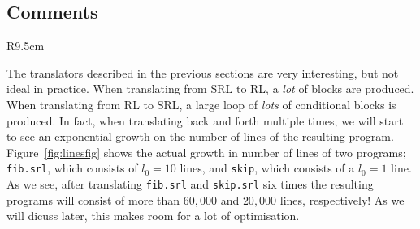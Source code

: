\pgfplotsset{compat = 1.3}
\subsection{Comments}
\begin{wrapfigure}{R}{9.5cm}
  \caption{Growth of a program for each translation.}\label{fig:linesfig}%
\end{wrapfigure}
The translators described in the previous sections are very interesting, but not ideal in practice. When translating from SRL to RL, a \textit{lot} of blocks are produced. When translating from RL to SRL, a large loop of \textit{lots} of conditional blocks is produced. In fact, when translating back and forth multiple times, we will start to see an exponential growth on the number of lines of the resulting program. Figure~\ref{fig:linesfig} shows the actual growth in number of lines of two programs; \texttt{fib.srl}, which consists of $l_0=10$ lines, and \texttt{skip}, which consists of a $l_0=1$ line. As we see, after translating \texttt{fib.srl} and \texttt{skip.srl} six times the resulting programs will consist of more than $60,000$ and $20,000$ lines, respectively! As we will dicuss later, this makes room for a lot of optimisation.
